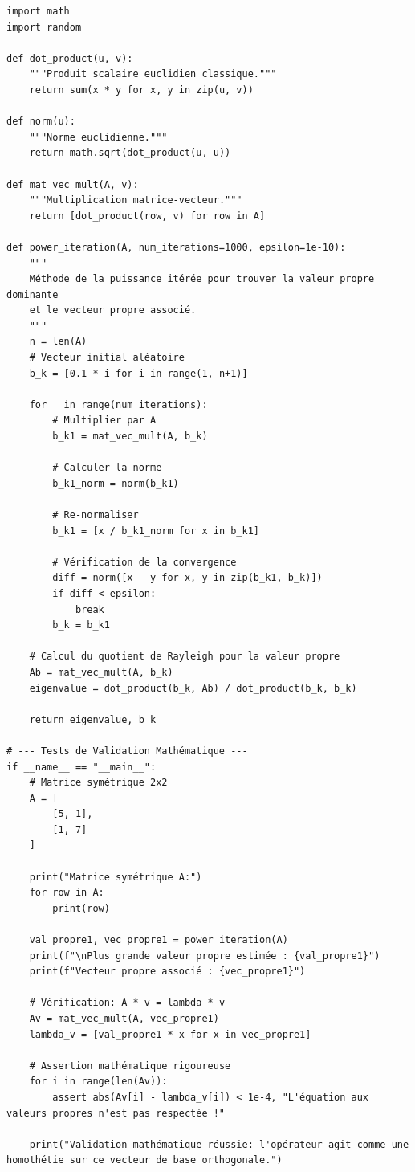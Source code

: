 \documentclass[11pt,a4paper]{article}
\begin{document}
\begin{lstlisting}
import math
import random

def dot_product(u, v):
    """Produit scalaire euclidien classique."""
    return sum(x * y for x, y in zip(u, v))

def norm(u):
    """Norme euclidienne."""
    return math.sqrt(dot_product(u, u))

def mat_vec_mult(A, v):
    """Multiplication matrice-vecteur."""
    return [dot_product(row, v) for row in A]

def power_iteration(A, num_iterations=1000, epsilon=1e-10):
    """
    Méthode de la puissance itérée pour trouver la valeur propre dominante
    et le vecteur propre associé.
    """
    n = len(A)
    # Vecteur initial aléatoire
    b_k = [0.1 * i for i in range(1, n+1)]

    for _ in range(num_iterations):
        # Multiplier par A
        b_k1 = mat_vec_mult(A, b_k)

        # Calculer la norme
        b_k1_norm = norm(b_k1)

        # Re-normaliser
        b_k1 = [x / b_k1_norm for x in b_k1]

        # Vérification de la convergence
        diff = norm([x - y for x, y in zip(b_k1, b_k)])
        if diff < epsilon:
            break
        b_k = b_k1

    # Calcul du quotient de Rayleigh pour la valeur propre
    Ab = mat_vec_mult(A, b_k)
    eigenvalue = dot_product(b_k, Ab) / dot_product(b_k, b_k)

    return eigenvalue, b_k

# --- Tests de Validation Mathématique ---
if __name__ == "__main__":
    # Matrice symétrique 2x2
    A = [
        [5, 1],
        [1, 7]
    ]

    print("Matrice symétrique A:")
    for row in A:
        print(row)

    val_propre1, vec_propre1 = power_iteration(A)
    print(f"\nPlus grande valeur propre estimée : {val_propre1}")
    print(f"Vecteur propre associé : {vec_propre1}")

    # Vérification: A * v = lambda * v
    Av = mat_vec_mult(A, vec_propre1)
    lambda_v = [val_propre1 * x for x in vec_propre1]

    # Assertion mathématique rigoureuse
    for i in range(len(Av)):
        assert abs(Av[i] - lambda_v[i]) < 1e-4, "L'équation aux valeurs propres n'est pas respectée !"

    print("Validation mathématique réussie: l'opérateur agit comme une homothétie sur ce vecteur de base orthogonale.")
\end{lstlisting}
\end{document}
